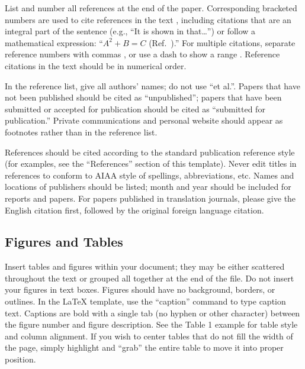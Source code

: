 \documentclass[journal ]{new-aiaa}
\begin{document}
List and number all references at the end of the paper. Corresponding bracketed numbers are used to cite references in the text \cite{vatistas1986reverse}, including citations that are an integral part of the sentence (e.g., ``It is shown in \cite{dornheim1996planetary} that\ldots '') or follow a mathematical expression: ``$A^{2} + B = C$ (Ref.~\cite{terster1997nasa}).'' For multiple citations, separate reference numbers with commas \cite{peyret2012computational,oates1997aerothermodynamics}, or use a dash to show a range \cite{volpe1994techniques,thompsonspacecraft,chi1993fluid,brandis2016nonequi}. Reference citations in the text should be in numerical order. 

In the reference list, give all authors' names; do not use ``et al.''. Papers that have not been published should be cited as ``unpublished''; papers that have been submitted or accepted for publication should be cited as ``submitted for publication.'' Private communications and personal website should appear as footnotes rather than in the reference list.

References should be cited according to the standard publication reference style (for examples, see the ``References'' section of this template). Never edit titles in references to conform to AIAA style of spellings, abbreviations, etc. Names and locations of publishers should be listed; month and year should be included for reports and papers. For papers published in translation journals, please give the English citation first, followed by the original foreign language citation.

\subsection{Figures and Tables}
Insert tables and figures within your document; they may be either scattered throughout the text or grouped all together at the end of the file. Do not insert your figures in text boxes. Figures should have no background, borders, or outlines. In the \LaTeX{} template, use the ``caption'' command to type caption text. Captions are bold with a single tab (no hyphen or other character) between the figure number and figure description. See the Table 1 example for table style and column alignment. If you wish to center tables that do not fill the width of the page, simply highlight and “grab” the entire table to move it into proper position.
\end{document}
